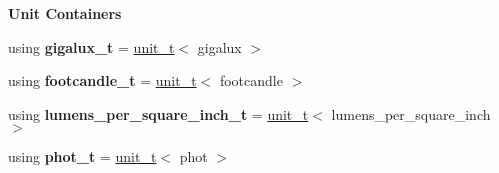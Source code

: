 \begin{Indent}{\bf Unit Containers}
\begin{DoxyCompactItemize}
\item 
\hypertarget{namespaceunits_1_1illuminance_a5a7c869c1d4c797d6500d6495bf1c481}{}using {\bfseries gigalux\+\_\+t} = \hyperlink{classunits_1_1unit__t}{unit\+\_\+t}$<$ gigalux $>$\label{namespaceunits_1_1illuminance_a5a7c869c1d4c797d6500d6495bf1c481}

\item 
\hypertarget{namespaceunits_1_1illuminance_aaaf9d82dc33c5a1df0cade3d9c9759ca}{}using {\bfseries footcandle\+\_\+t} = \hyperlink{classunits_1_1unit__t}{unit\+\_\+t}$<$ footcandle $>$\label{namespaceunits_1_1illuminance_aaaf9d82dc33c5a1df0cade3d9c9759ca}

\item 
\hypertarget{namespaceunits_1_1illuminance_a262203751001590962ee1df48f6b4efe}{}using {\bfseries lumens\+\_\+per\+\_\+square\+\_\+inch\+\_\+t} = \hyperlink{classunits_1_1unit__t}{unit\+\_\+t}$<$ lumens\+\_\+per\+\_\+square\+\_\+inch $>$\label{namespaceunits_1_1illuminance_a262203751001590962ee1df48f6b4efe}

\item 
\hypertarget{namespaceunits_1_1illuminance_a7338f058f11442ba9fc428ff6752b9cc}{}using {\bfseries phot\+\_\+t} = \hyperlink{classunits_1_1unit__t}{unit\+\_\+t}$<$ phot $>$\label{namespaceunits_1_1illuminance_a7338f058f11442ba9fc428ff6752b9cc}

\end{DoxyCompactItemize}
\end{Indent}
